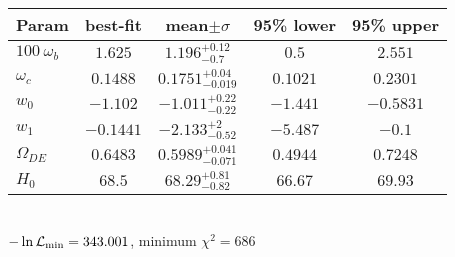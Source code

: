 \begin{tabular}{|l|c|c|c|c|} 
 \hline 
Param & best-fit & mean$\pm\sigma$ & 95\% lower & 95\% upper \\ \hline 
$100~\omega_{b }$ &$1.625$ & $1.196_{-0.7}^{+0.12}$ & $0.5$ & $2.551$ \\ 
$\omega_c$ &$0.1488$ & $0.1751_{-0.019}^{+0.04}$ & $0.1021$ & $0.2301$ \\ 
$w_{0 }$ &$-1.102$ & $-1.011_{-0.22}^{+0.22}$ & $-1.441$ & $-0.5831$ \\ 
$w_{1 }$ &$-0.1441$ & $-2.133_{-0.52}^{+2}$ & $-5.487$ & $-0.1$ \\ 
$\Omega_{DE}$ &$0.6483$ & $0.5989_{-0.071}^{+0.041}$ & $0.4944$ & $0.7248$ \\ 
$H_{0 }$ &$68.5$ & $68.29_{-0.82}^{+0.81}$ & $66.67$ & $69.93$ \\ 
\hline 
 \end{tabular} \\ 
$-\ln{\cal L}_\mathrm{min} =343.001$, minimum $\chi^2=686$ \\ 
